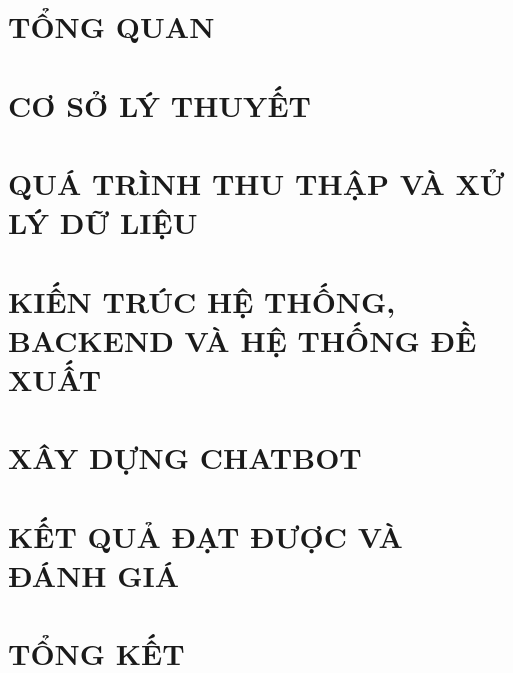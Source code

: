 

 

\begingroup
\fontsize{12pt}{14pt}\selectfont
\tableofcontents
\clearpage
\listoffigures

\endgroup

\clearpage
\chapter{TỔNG QUAN}
\setcounter{page}{1}

\chapter{CƠ SỞ LÝ THUYẾT}

\chapter{QUÁ TRÌNH THU THẬP VÀ XỬ LÝ DỮ LIỆU}





\chapter{KIẾN TRÚC HỆ THỐNG, BACKEND VÀ HỆ THỐNG ĐỀ XUẤT}


\chapter{XÂY DỰNG CHATBOT}


\chapter{KẾT QUẢ ĐẠT ĐƯỢC VÀ ĐÁNH GIÁ}


\chapter{TỔNG KẾT}


